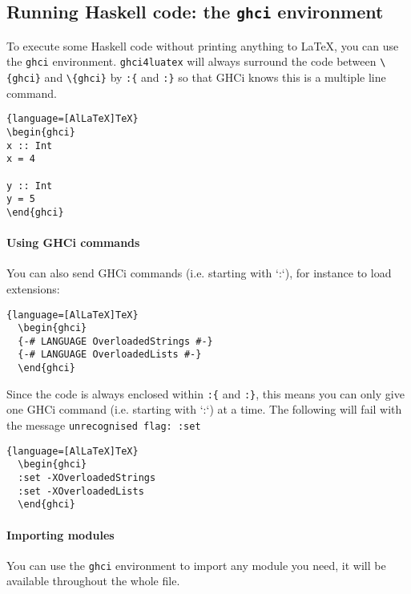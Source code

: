 \documentclass{article}
\begin{document}
\subsection{Running Haskell code: the \texttt{ghci} environment}

To execute some Haskell code without printing anything to LaTeX, you can use the \texttt{ghci} environment. \texttt{ghci4luatex} will always surround the code between \texttt{\textbackslash {}\{ghci\}} and  \texttt{\textbackslash {}\{ghci\}} by \texttt{:\{} and \texttt{:\}} so that GHCi knows this is a multiple line command.

\begin{latexbox}
\begin{lstlisting}{language=[AlLaTeX]TeX}
\begin{ghci}
x :: Int
x = 4

y :: Int
y = 5
\end{ghci}
\end{lstlisting}
\end{latexbox}

\paragraph{Using GHCi commands} You can also send GHCi commands (i.e. starting with `:`), for instance to load extensions:

  \begin{lstlisting}{language=[AlLaTeX]TeX}
  \begin{ghci}
  {-# LANGUAGE OverloadedStrings #-}
  {-# LANGUAGE OverloadedLists #-}
  \end{ghci}
  \end{lstlisting}

\begin{warningbox}
  Since the code is always enclosed within \texttt{:\{} and \texttt{:\}}, this means you can only give one GHCi command (i.e. starting with `:`) at a time. The following will fail with the message \texttt{unrecognised flag: :set}
  \begin{lstlisting}{language=[AlLaTeX]TeX}
  \begin{ghci}
  :set -XOverloadedStrings
  :set -XOverloadedLists
  \end{ghci}
  \end{lstlisting}

\end{warningbox}


\paragraph{Importing modules}
You can use the \texttt{ghci} environment to import any module you need, it will be available throughout the whole file.
\end{document}
